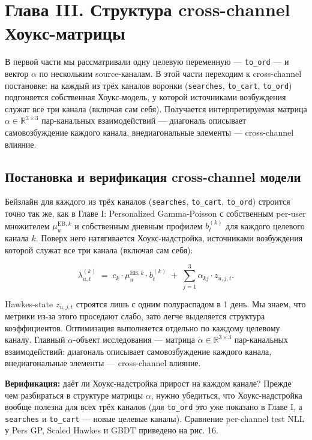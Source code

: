 \documentclass[12pt,a4paper]{article}
\begin{document}
\clearpage
\section{Глава III. Структура cross-channel Хоукс-матрицы}

В первой части мы рассматривали одну целевую переменную --- \texttt{to\_ord} --- и вектор $\alpha $ по нескольким source-каналам. В этой части переходим к cross-channel постановке: на каждый из трёх каналов воронки (\texttt{searches}, \texttt{to\_cart}, \texttt{to\_ord}) подгоняется собственная Хоукс-модель, у которой источниками возбуждения служат все три канала (включая сам себя). Получается интерпретируемая матрица $\alpha  \in  \mathbb{R}^{3\times 3}$ пар-канальных взаимодействий --- диагональ описывает самовозбуждение каждого канала, внедиагональные элементы --- cross-channel влияние.

\FloatBarrier
\subsection{Постановка и верификация cross-channel модели}

Бейзлайн для каждого из трёх каналов (\texttt{searches}, \texttt{to\_cart}, \texttt{to\_ord}) строится точно так же, как в Главе I: Personalized Gamma-Poisson с собственным per-user множителем $\mu _u^{\mathrm{EB},k}$ и собственным дневным профилем $b_t^{(k)}$ для каждого целевого канала $k$. Поверх него натягивается Хоукс-надстройка, источниками возбуждения которой служат все три канала (включая сам себя):

\[
\lambda^{(k)}_{u,t} \;=\; c_k \cdot \mu_u^{\mathrm{EB},k} \cdot b_t^{(k)} \;+\; \sum_{j=1}^{3} \alpha_{kj} \cdot z_{u,j,t}.
\]

Hawkes-state $z_{u,j,t}$ строятся лишь с одним полураспадом в 1 день. Мы знаем, что метрики из-за этого проседают слабо, зато легче выделяется структура коэффициентов. Оптимизация выполняется отдельно по каждому целевому каналу. Главный $\alpha$-объект исследования --- матрица $\alpha  \in  \mathbb{R}^{3\times 3}$ пар-канальных взаимодействий: диагональ описывает самовозбуждение каждого канала, внедиагональные элементы --- cross-channel влияние.

\textbf{Верификация:} даёт ли Хоукс-надстройка прирост на каждом канале? Прежде чем разбираться в структуре матрицы $\alpha$, нужно убедиться, что Хоукс-надстройка вообще полезна для всех трёх каналов (для \texttt{to\_ord} это уже показано в Главе I, а \texttt{searches} и \texttt{to\_cart} --- новые целевые каналы). Сравнение per-channel test NLL у Pers GP, Scaled Hawkes и GBDT приведено на рис. 16.
\end{document}
